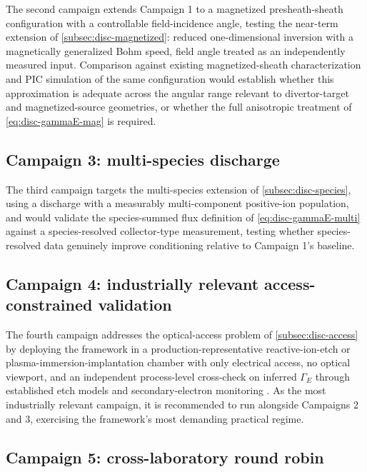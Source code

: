 The second campaign extends Campaign 1 to a magnetized presheath-sheath configuration with a controllable field-incidence angle, testing the near-term extension of \cref{subsec:disc-magnetized}: reduced one-dimensional inversion with a magnetically generalized Bohm speed, field angle treated as an independently measured input. Comparison against existing magnetized-sheath characterization \cite{ref0088} and PIC simulation of the same configuration \cite{ref0633} would establish whether this approximation is adequate across the angular range relevant to divertor-target and magnetized-source geometries, or whether the full anisotropic treatment of \cref{eq:disc-gammaE-mag} is required.

\subsection{Campaign 3: multi-species discharge}

The third campaign targets the multi-species extension of \cref{subsec:disc-species}, using a discharge with a measurably multi-component positive-ion population, and would validate the species-summed flux definition of \cref{eq:disc-gammaE-multi} \cite{ref0655,ref0090} against a species-resolved collector-type measurement, testing whether species-resolved data genuinely improve conditioning relative to Campaign 1's baseline.

\subsection{Campaign 4: industrially relevant access-constrained validation}

The fourth campaign addresses the optical-access problem of \cref{subsec:disc-access} by deploying the framework in a production-representative reactive-ion-etch or plasma-immersion-implantation chamber with only electrical access, no optical viewport, and an independent process-level cross-check on inferred $\Gamma_{E}$ through established etch models \cite{ref0074} and secondary-electron monitoring \cite{ref0078}. As the most industrially relevant campaign, it is recommended to run alongside Campaigns 2 and 3, exercising the framework's most demanding practical regime.

\subsection{Campaign 5: cross-laboratory round robin}

